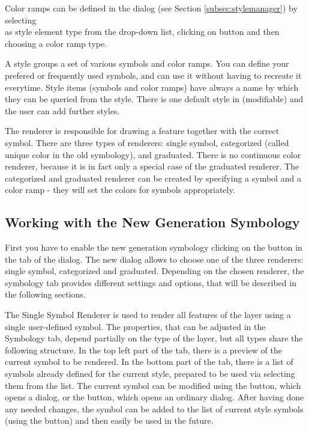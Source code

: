 Color ramps can be defined in the  dialog (see Section
\ref{subsec:stylemanager}) by selecting \\
 as style element type from the drop-down list, clicking on  button and then choosing a color ramp type.


A style groups a set of various symbols and color ramps. You can define your
prefered or frequently used symbols, and can use it without having to recreate
it everytime. Style items (symbols and color ramps) have always a name by which
they can be queried from the style. There is one default style in \qg (modifiable)
and the user can add further styles.


The renderer is responsible for drawing a feature together with the correct
symbol. There are three types of renderers: single symbol, categorized (called
unique color in the old symbology), and graduated. There is no continuous color
renderer, because it is in fact only a special case of the graduated renderer.
The categorized and graduated renderer can be created by specifying a symbol
and a color ramp - they will set the colors for symbols appropriately.

\subsection{Working with the New Generation Symbology}

First you have to enable the new generation symbology clicking on the
 button in the  tab of the
 dialog. The new dialog allows to choose one of the
three renderers: single symbol, categorized and graduated. Depending on the
chosen renderer, the symbology tab provides different settings and options, that
will be described in the following sections.


The Single Symbol Renderer is used to render all features of the layer using a
single user-defined symbol. The properties, that can be adjusted in the
Symbology tab, depend partially on the type of the layer, but all types share
the following structure. In the top left part of the tab, there is a preview of
the current symbol to be rendered. In the bottom part of the tab, there is a
list of symbols already defined for the current style, prepared to be used via
selecting them from the list. The current symbol can be modified using the
 button, which opens a  dialog, or
the  button, which opens an ordinary  dialog.
After having done any needed changes, the symbol can be added to the list of
current style symbols (using the  button) and then easily
be used in the future.

